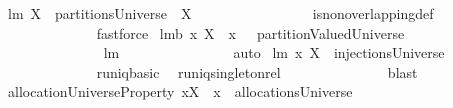 \begin{isabellebody}
\isanewline
{}\isamarkupfalse%
\ lm{}{}{\isacharcolon}\ {\isachardoublequoteopen}{\isacharparenleft}{\isacharbraceleft}X{\isacharbraceright}\ {\isasymin}\ partitionsUniverse{\isacharparenright}\ {\isacharequal}\ {\isacharparenleft}X\ {\isasymnoteq}\ {\isacharbraceleft}{\isacharbraceright}{\isacharparenright}{\isachardoublequoteclose}\ \isanewline
%
\isadelimproof
\ \ \ \ \ \ \ \ \ \ \ \ %
\endisadelimproof
%
\isatagproof
{}\isamarkupfalse%
\ is{\isacharunderscore}non{\isacharunderscore}overlapping{\isacharunderscore}def\ \isanewline
\ \ \ \ \ \ \ \ \ \ \ \ \isamarkupfalse%
\ fastforce%
\endisatagproof
{\isafoldproof}%
%
\isadelimproof
\isanewline
%
\endisadelimproof
\isanewline
{}\isamarkupfalse%
\ lm{}{}b{\isacharcolon}\ {\isachardoublequoteopen}{\isacharbraceleft}{\isacharparenleft}x{\isacharcomma}\ X{\isacharparenright}{\isacharbraceright}\ {\isacharminus}\ {\isacharbraceleft}{\isacharparenleft}x{\isacharcomma}\ {\isacharbraceleft}{\isacharbraceright}{\isacharparenright}{\isacharbraceright}\ {\isasymin}\ partitionValuedUniverse{\isachardoublequoteclose}\ \isanewline
%
\isadelimproof
\ \ \ \ \ \ \ \ \ \ \ \ \ %
\endisadelimproof
%
\isatagproof
{}\isamarkupfalse%
\ lm{}{}\ \isanewline
\ \ \ \ \ \ \ \ \ \ \ \ \ \isamarkupfalse%
\ auto%
\endisatagproof
{\isafoldproof}%
%
\isadelimproof
\isanewline
%
\endisadelimproof
\isanewline
{}\isamarkupfalse%
\ lm{}{}{\isacharcolon}\ {\isachardoublequoteopen}{\isacharbraceleft}{\isacharparenleft}x{\isacharcomma}\ X{\isacharparenright}{\isacharbraceright}\ {\isasymin}\ injectionsUniverse{\isachardoublequoteclose}\ \isanewline
%
\isadelimproof
\ \ \ \ \ \ \ \ \ \ \ \ %
\endisadelimproof
%
\isatagproof
{}\isamarkupfalse%
\ runiq{\isacharunderscore}basic\ \isamarkupfalse%
\ runiq{\isacharunderscore}singleton{\isacharunderscore}rel\ \isanewline
\ \ \ \ \ \ \ \ \ \ \ \ \isamarkupfalse%
\ blast%
\endisatagproof
{\isafoldproof}%
%
\isadelimproof
\isanewline
%
\endisadelimproof
\isanewline
{}\isamarkupfalse%
\ allocationUniverseProperty{\isacharcolon}\ {\isachardoublequoteopen}{\isacharbraceleft}{\isacharparenleft}x{\isacharcomma}X{\isacharparenright}{\isacharbraceright}\ {\isacharminus}\ {\isacharbraceleft}{\isacharparenleft}x{\isacharcomma}{\isacharbraceleft}{\isacharbraceright}{\isacharparenright}{\isacharbraceright}\ {\isasymin}\ allocationsUniverse{\isachardoublequoteclose}\ \isanewline

\end{isabellebody}
